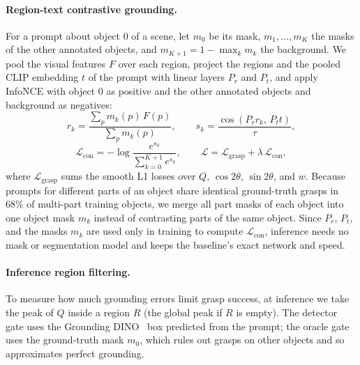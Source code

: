 \paragraph{Region-text contrastive grounding.}
For a prompt about object $0$ of a scene, let $m_0$ be its mask, $m_1, \dots, m_K$ the masks of the other annotated objects, and $m_{K+1} = 1 - \max_k m_k$ the background.
We pool the visual features $F$ over each region, project the regions and the pooled CLIP embedding $t$ of the prompt with linear layers $P_r$ and $P_t$, and apply InfoNCE with object $0$ as positive and the other annotated objects and background as negatives:
\begin{equation}
  r_k = \frac{\sum_p m_k(p)\, F(p)}{\sum_p m_k(p)}, \qquad
  s_k = \frac{\cos(P_r r_k,\, P_t t)}{\tau},
  \label{eq:region}
\end{equation}
\vspace{-6pt}
\begin{equation}
  \mathcal{L}_{\mathrm{con}} = -\log \frac{e^{s_0}}{\sum_{k=0}^{K+1} e^{s_k}}, \qquad
  \mathcal{L} = \mathcal{L}_{\mathrm{grasp}} + \lambda\, \mathcal{L}_{\mathrm{con}},
  \label{eq:loss}
\end{equation}
where $\mathcal{L}_{\mathrm{grasp}}$ sums the smooth L1 losses over $Q$, $\cos 2\theta$, $\sin 2\theta$, and $w$.
Because prompts for different parts of an object share identical ground-truth grasps in 68\% of multi-part training objects, we merge all part masks of each object into one object mask $m_k$ instead of contrasting parts of the same object.
Since $P_r$, $P_t$, and the masks $m_k$ are used only in training to compute $\mathcal{L}_{\mathrm{con}}$, inference needs no mask or segmentation model and keeps the baseline's exact network and speed.

\paragraph{Inference region filtering.}
To measure how much grounding errors limit grasp success, at inference we take the peak of $Q$ inside a region $R$ (the global peak if $R$ is empty).
The detector gate uses the Grounding DINO~\cite{liu2024grounding} box predicted from the prompt; the oracle gate uses the ground-truth mask $m_0$, which rules out grasps on other objects and so approximates perfect grounding.
